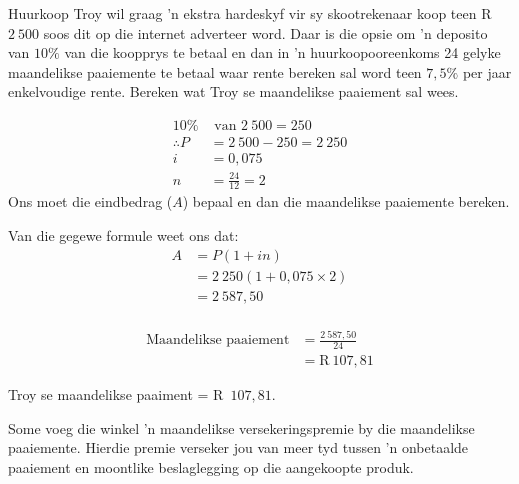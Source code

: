 \begin{wex}{Huurkoop}
{Troy wil graag ’n ekstra hardeskyf vir sy
skootrekenaar koop teen R~$2~500$ soos dit op die internet adverteer word.
Daar is die opsie om ’n deposito van $10\%$ van die koopprys te betaal
en dan in ’n huurkoopooreenkoms 24 gelyke maandelikse paaiemente
te betaal waar rente bereken sal word teen $7,5\%$ per jaar enkelvoudige
rente. Bereken wat Troy se maandelikse paaiement sal wees.}
{

\begin{align*}
      10\% &\mbox{ van } 2~500= 250\\
      \therefore P &= 2~500-250 =2~250\\
      i &= 0,075\\
      n &= \frac{24}{12} =2
    \end{align*}
    Ons moet die eindbedrag ($A$) bepaal en dan die maandelikse
paaiemente bereken.

Van die gegewe formule weet ons dat:
    \begin{align*}
A &= P(1 + in)\\
	 &= 2~250(1 + 0,075 \times 2)\\
	  &= 2~587,50\\
    \end{align*}

    \begin{align*}
	\mbox{Maandelikse paaiement} &= \frac{2~587,50}{24}\\
			&= \mbox{R}~107,81
    \end{align*}

    Troy se maandelikse paaiment = R~$107,81$.
}
\end{wex}


Some voeg die winkel 'n maandelikse versekeringspremie by die maandelikse paaiemente. Hierdie premie verseker jou van meer tyd tussen 'n onbetaalde paaiement en moontlike beslaglegging op die aangekoopte produk.


